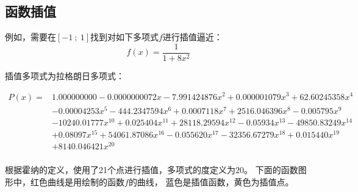 \documentclass[../main.tex]{subfiles}
\begin{document}
\subsection{函数插值}

例如，需要在$[-1~;~1]$找到对如下多项式$f$进行插值逼近：
\[
  f(x)=\frac{1}{1+8x^2}
\]

插值多项式为拉格朗日多项式：

\begin{equation*}
\begin{split}
 P(x) = &1.000000000-0.0000000072x-7.991424876x^2+0.000001079x^3+62.60245358x^4\\
 & -0.00004253x^5-444.2347594x^6+0.0007118x^7+ 2516.046396x^8 -0.005795x^9\\ &-10240.01777x^{10} +0.025404x^{11}+28118.29594x^{12} -0.05934x^{13} -49850.83249x^{14} \\
& +0.08097x^{15}+54061.87086x^{16} -0.055620x^{17} -32356.67279x^{18} +0.015440x^{19}\\
&+8140.046421x^{20}\\
\end{split}
\end{equation*}

根据霍纳的定义，使用了21个点进行插值，多项式的度定义为$20$。
下面的函数图形中，红色曲线是用绘制的函数$f$的曲线，
蓝色是插值函数，黄色为插值点。
\end{document}
